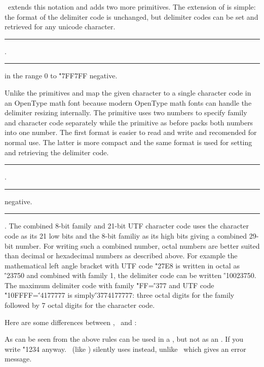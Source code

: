 \HiTeX\ extends this notation and adds two more primitives.
The extension of  is simple: the format of the
delimiter code is unchanged, but delimiter codes can be set and retrieved for any unicode character.
\medskip
\rule{}: .
\rule{}:
 \opt{\.{=}}  in the range 0 to \.{"7FF7FF} \OR negative.
\medskip

Unlike  the primitives  and  map
the given character to a single character code in an OpenType math font because
modern OpenType math fonts can handle the delimiter resizing internally.
The primitive  uses two numbers to specify family and character code separately
while the primitive  as before packs both numbers into one number.
The first format is easier to read and write and recomended for normal use. The latter is more
compact and the same format is used for setting and retrieving the delimiter code.
\medskip
\rule{}:
 \opt{\.{=}}  . 
\rule{}:
 \opt{\.{=}}  \OR negative. 
\rule{}: .
\medskip
The combined 8-bit family and 21-bit UTF character code uses the character code as its 21 low bits
and the 8-bit familiy as its high bits giving a combined 29-bit number. For writing such a combined number,
octal numbers are better suited than decimal or hexadecimal numbers as described above.
For example the mathematical left angle bracket with UTF code \.{"27E8} is written in octal
as \.{'23750} and combined with family 1, the delimiter code can be written
\.{'10023750}. The maximum delimiter code with family \.{"FF}=\.{'377} and UTF code
\.{"10FFFF}=\.{'4177777} is simply\.{'3774177777}: three octal digits for the family followed by
7 octal digits for the character code.



\noindent Here are some differences between \HiTeX, \LuaTeX\ and \XeTeX:
\itemize
\item As can be seen from the above rules  can be used in a ,
but not as an . If you write
\.{"1234} anyway. \HiTeX\ (like \LuaTeX) silently uses
 instead, unlike  \XeTeX\ which gives an error message.

